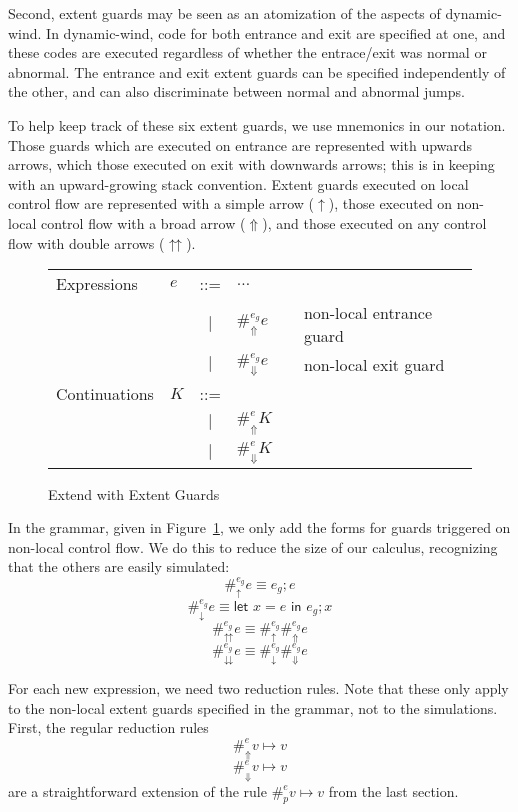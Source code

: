 \documentclass[11pt]{article}
\newcommand{\letin}[2]{\textsf{let }#1\textsf{ in }#2}
\begin{document}
Second, extent guards may be seen as an atomization of the aspects of dynamic-wind.
In dynamic-wind, code for both entrance and exit are specified at one, and these codes are executed regardless of whether the entrace/exit was normal or abnormal.
The entrance and exit extent guards can be specified independently of the other, and can also discriminate between normal and abnormal jumps.

To help keep track of these six extent guards, we use mnemonics in our notation.
Those guards which are executed on entrance are represented with upwards arrows, which those executed on exit with downwards arrows; this is in keeping with an upward-growing stack convention.
Extent guards executed on local control flow are represented with a simple arrow ($\uparrow$), those executed on non-local control flow with a broad arrow ($\Uparrow$), and those executed on any control flow with double arrows ($\upuparrows$).

\begin{figure}[H]
\caption{Extend with Extent Guards}
\label{fig:addGuards}

\begin{tabular}{llclll}
Expressions & $e$ & ::= & $\ldots$ &  \\
& & $|$ & $\#_\Uparrow^{e_g}e$ && non-local entrance guard \\
& & $|$ & $\#_\Downarrow^{e_g}e$ && non-local exit guard \\
Continuations & $K$ & ::= & \\
& & $|$ & $\#_{\Uparrow}^{e}K$ &&  \\
& & $|$ & $\#_{\Downarrow}^{e}K$ &&  \\
\end{tabular}
\end{figure}

In the grammar, given in Figure~\ref{fig:addGuards}, we only add the forms for guards triggered on non-local control flow.
We do this to reduce the size of our calculus, recognizing that the others are easily simulated:
$$\#_\uparrow^{e_g}e \equiv e_g; e$$
$$\#_\downarrow^{e_g}e \equiv \letin{x=e}{e_g; x}$$
$$\#_\upuparrows^{e_g}e \equiv \#_\uparrow^{e_g}\#_\Uparrow^{e_g}e$$
$$\#_\downdownarrows^{e_g}e \equiv \#_\downarrow^{e_g}\#_\Downarrow^{e_g}e$$


For each new expression, we need two reduction rules.
Note that these only apply to the non-local extent guards specified in the grammar, not to the simulations.
First, the regular reduction rules
$$\#_{\Uparrow}^{e}v \mapsto v$$
$$\#_{\Downarrow}^{e}v \mapsto v$$
are a straightforward extension of the rule $\#_{p}^{e}v \mapsto v$ from the last section.
\end{document}
